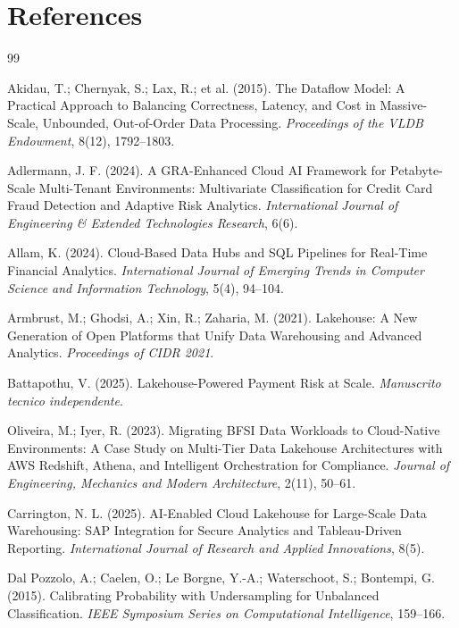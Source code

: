 \documentclass[10pt,twocolumn]{article}
\begin{document}
\section{References}
\begin{thebibliography}{99}

Akidau, T.; Chernyak, S.; Lax, R.; et al. (2015). The Dataflow Model: A Practical Approach to Balancing Correctness, Latency, and Cost in Massive-Scale, Unbounded, Out-of-Order Data Processing. \textit{Proceedings of the VLDB Endowment}, 8(12), 1792--1803.

Adlermann, J. F. (2024). A GRA-Enhanced Cloud AI Framework for Petabyte-Scale Multi-Tenant Environments: Multivariate Classification for Credit Card Fraud Detection and Adaptive Risk Analytics. \textit{International Journal of Engineering \& Extended Technologies Research}, 6(6).

Allam, K. (2024). Cloud-Based Data Hubs and SQL Pipelines for Real-Time Financial Analytics. \textit{International Journal of Emerging Trends in Computer Science and Information Technology}, 5(4), 94--104.

Armbrust, M.; Ghodsi, A.; Xin, R.; Zaharia, M. (2021). Lakehouse: A New Generation of Open Platforms that Unify Data Warehousing and Advanced Analytics. \textit{Proceedings of CIDR 2021}.

Battapothu, V. (2025). Lakehouse-Powered Payment Risk at Scale. \textit{Manuscrito tecnico independente}.

Oliveira, M.; Iyer, R. (2023). Migrating BFSI Data Workloads to Cloud-Native Environments: A Case Study on Multi-Tier Data Lakehouse Architectures with AWS Redshift, Athena, and Intelligent Orchestration for Compliance. \textit{Journal of Engineering, Mechanics and Modern Architecture}, 2(11), 50--61.

Carrington, N. L. (2025). AI-Enabled Cloud Lakehouse for Large-Scale Data Warehousing: SAP Integration for Secure Analytics and Tableau-Driven Reporting. \textit{International Journal of Research and Applied Innovations}, 8(5).

Dal Pozzolo, A.; Caelen, O.; Le Borgne, Y.-A.; Waterschoot, S.; Bontempi, G. (2015). Calibrating Probability with Undersampling for Unbalanced Classification. \textit{IEEE Symposium Series on Computational Intelligence}, 159--166.


\end{thebibliography}
\end{document}
